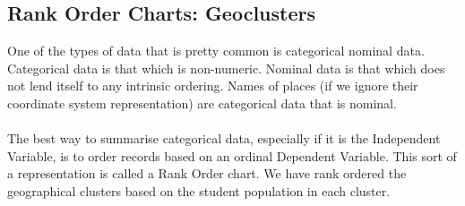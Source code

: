 \documentclass[10pt]{article}
\begin{document}
\subsection{Rank Order Charts: Geoclusters}
One of the types of data that is pretty common is categorical nominal data. Categorical data is that which is non-numeric. Nominal data is that which does not lend itself to any intrinsic ordering. Names of places (if we ignore their coordinate system representation) are categorical data that is nominal.\\\\
The best way to summarise categorical data, especially if it is the Independent Variable, is to order records based on an ordinal Dependent Variable. This sort of a representation is called a Rank Order chart.
We have rank ordered the geographical clusters based on the student population in each cluster.
\setcounter{rownum}{0}
\end{document}
